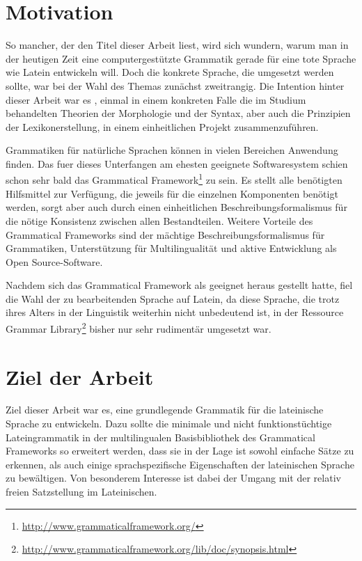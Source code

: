 \documentclass[12pt,abstract=on]{scrreprt}
\begin{document}
\section{Motivation}
So mancher, der den Titel dieser Arbeit liest, wird sich wundern, warum man in der heutigen Zeit eine computergestützte Grammatik gerade für eine tote Sprache wie Latein entwickeln will. Doch die konkrete Sprache, die umgesetzt werden sollte, war bei der Wahl des Themas zunächst zweitrangig. Die Intention hinter dieser Arbeit war es , einmal in einem konkreten Falle die im Studium behandelten Theorien der Morphologie und der Syntax, aber auch die Prinzipien der Lexikonerstellung, in einem einheitlichen Projekt zusammenzuführen. \par
Grammatiken für natürliche Sprachen können in vielen Bereichen Anwendung finden. 
Das fuer dieses Unterfangen am ehesten geeignete Softwaresystem schien schon sehr bald das Grammatical Framework\footnote{\url{http://www.grammaticalframework.org/}} zu sein. Es stellt alle benötigten Hilfsmittel zur Verfügung, die jeweils für die einzelnen Komponenten benötigt werden, sorgt aber auch durch einen einheitlichen Beschreibungsformalismus für die nötige Konsistenz zwischen allen Bestandteilen. Weitere Vorteile des Grammatical Frameworks sind der mächtige Beschreibungsformalismus für Grammatiken, Unterstützung für Multilingualität und aktive Entwicklung als Open Source-Software. \par
Nachdem sich das Grammatical Framework als geeignet heraus gestellt hatte, fiel die Wahl der zu bearbeitenden Sprache auf Latein, da diese Sprache, die trotz ihres Alters in der Linguistik weiterhin nicht unbedeutend ist, in der Ressource Grammar Library\footnote{\url{http://www.grammaticalframework.org/lib/doc/synopsis.html}} bisher nur sehr rudimentär umgesetzt war. \par
\pagebreak
\section{Ziel der Arbeit}
Ziel dieser Arbeit war es, eine grundlegende Grammatik für die lateinische Sprache zu entwickeln. Dazu sollte die minimale und nicht funktionstüchtige Lateingrammatik in der multilingualen Basisbibliothek des Grammatical Frameworks so erweitert werden, dass sie in der Lage ist sowohl einfache Sätze zu erkennen, als auch einige sprachspezifische Eigenschaften der lateinischen Sprache zu bewältigen. Von besonderem Interesse ist dabei der Umgang mit der relativ freien Satzstellung im Lateinischen. 
\pagebreak
\end{document}
